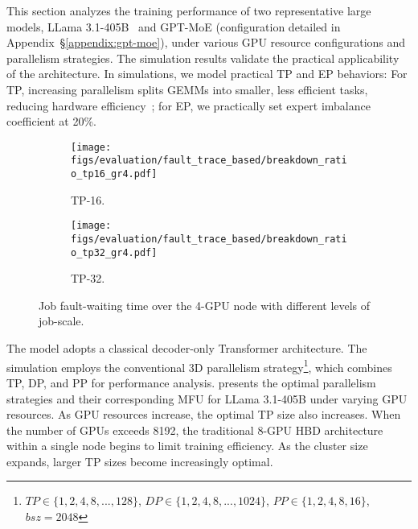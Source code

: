 This section analyzes the training performance of two representative large models, {LLama 3.1-405B}~\cite{llama3herdmodels} and {GPT-MoE} (configuration detailed in Appendix~\S\ref{appendix:gpt-moe}), under various GPU resource configurations and parallelism strategies. The simulation results validate the practical applicability of the \sys{} architecture. In simulations, we model practical TP and EP behaviors: For TP, increasing parallelism splits GEMMs into smaller, less efficient tasks, reducing hardware efficiency~\cite{gemm-eff}; for EP, we practically set expert imbalance coefficient at 20\%.


\begin{figure}[h!t]
    \vspace{-1em}
    \centering
    \begin{subfigure}[b]{0.23\textwidth}
        \centering
        \texttt{[image: figs/evaluation/fault\_trace\_based/breakdown\_ratio\_tp16\_gr4.pdf]}
        \vspace{-1em}
        \caption{TP-16.}
        \label{fig:simulation:breakdown-duration:tp16-8gpu}
    \end{subfigure}
    \hspace{2pt}
    \begin{subfigure}[b]{0.23\textwidth}
        \centering
        \texttt{[image: figs/evaluation/fault\_trace\_based/breakdown\_ratio\_tp32\_gr4.pdf]}
        \vspace{-1em}
        \caption{TP-32.}
        \label{fig:simulation:breakdown-duration:tp32-8gpu}
    \end{subfigure}
    \vspace{-2em}
    \caption{Job fault-waiting time over the 4-GPU node with different levels of job-scale.}
    \vspace{-1em}
    \label{fig:simulation:breakdown-duration}
\end{figure}

The model adopts a classical decoder-only Transformer architecture. The simulation employs the conventional 3D parallelism strategy\footnote{$TP \in \{1,2,4,8,...,128\}$, $DP \in \{1,2,4,8,...,1024\}$, $PP \in \{1,2,4,8,16\}$, $bsz=2048$}, which combines TP, DP, and PP for performance analysis. 
 presents the optimal parallelism strategies and their corresponding MFU for LLama 3.1-405B under varying GPU resources. As GPU resources increase, the optimal TP size also increases. When the number of GPUs exceeds 8192, the traditional 8-GPU HBD architecture within a single node begins to limit training efficiency. As the cluster size expands, larger TP sizes become increasingly optimal.





